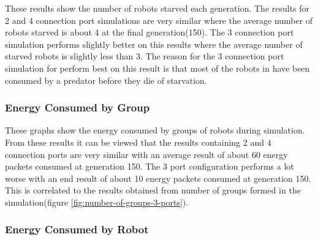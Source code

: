 These results show the number of robots starved each generation.
The results for 2 and 4 connection port simulations are very similar where the average number of robots starved is about 4 at the final generation(150).
The 3 connection port simulation performs slightly better on this results where the average number of starved robots is slightly less than 3.
The reason for the 3 connection port simulation for perform best on this result is that most of the robots in have been consumed by a predator before they die of starvation.

\vspace*{\fill}
\newpage
\vspace*{\fill}
\begin{center}
	\subsubsection{Energy Consumed by Group}
	\vspace*{-0.6cm}
\end{center}


These graphs show the energy consumed by groups of robots during simulation.
From these results it can be viewed that the results containing 2 and 4 connection ports are very similar with an average result of about 60 energy packets consumed at generation 150.
The 3 port configuration performs a lot worse with an end result of about 10 energy packets consumed at generation 150.
This is correlated to the results obtained from number of groups formed in the simulation(figure \ref{fig:number-of-groups-3-ports}).


\vspace*{\fill}
\newpage
\vspace*{\fill}

\begin{center}
	\subsubsection{Energy Consumed by Robot}
	\vspace*{-0.6cm}
\end{center}

